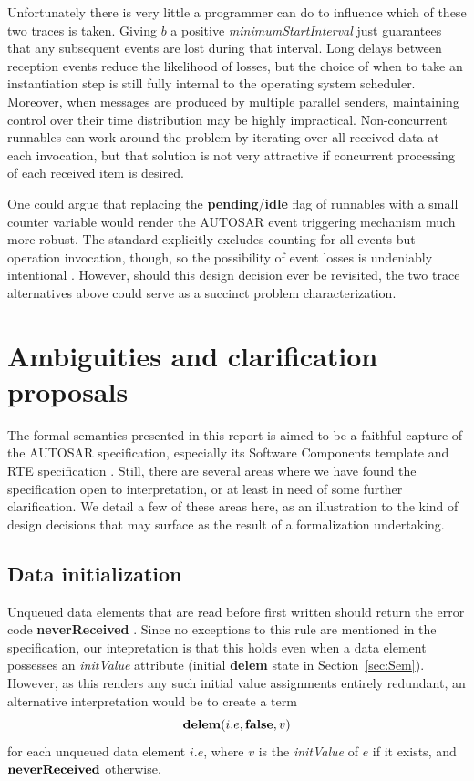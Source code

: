 \documentclass[10pt,conference]{IEEEtran}
\begin{document}
Unfortunately there is very little a programmer can do to influence which of these two traces is taken. Giving $b$ a positive \emph{minimumStartInterval} just guarantees that any subsequent events are lost during that interval. Long delays between reception events reduce the likelihood of losses, but the choice of when to take an instantiation step is still fully internal to the operating system scheduler. Moreover, when messages are produced by multiple parallel senders, maintaining control over their time distribution may be highly impractical. Non-concurrent runnables can work around the problem by iterating over all received data at each invocation, but that solution is not very attractive if concurrent processing of each received item is desired.

One could argue that replacing the {\bf pending}/{\bf idle} flag of runnables with a small counter variable would render the AUTOSAR event triggering mechanism much more robust. The standard explicitly excludes counting for all events but operation invocation, though, so the possibility of event losses is undeniably intentional \cite[p.~128]{AR:RTE}. However, should this design decision ever be revisited, the two trace alternatives above could serve as a succinct problem characterization.


\section{Ambiguities and clarification proposals}
\label{sec:Amb}

The formal semantics presented in this report is aimed to be a faithful capture of the AUTOSAR specification, especially its Software Components template and RTE specification \cite{AR:SWC, AR:RTE}. Still, there are several areas where we have found the specification open to interpretation, or at least in need of some further clarification. We detail a few of these areas here, as an illustration to the kind of design decisions that may surface as the result of a formalization undertaking.


\subsection{Data initialization}

Unqueued data elements that are read before first written should return the error code {\bf neverReceived} \cite[ch.~5.6.10]{AR:RTE}. Since no exceptions to this rule are mentioned in the specification, our intepretation is that this holds even when a data element possesses an \emph{initValue} attribute  (initial {\bf delem} state in Section~\ref{sec:Sem}). However, as this renders any such initial value assignments entirely redundant, an alternative interpretation would be to create a term
$$
  \textbf{delem}(i.e,\textbf{false},v)
$$
for each unqueued data element $i.e$, where $v$ is the \emph{initValue} of $e$ if it exists, and $\textbf{neverReceived}$ otherwise.
\end{document}
